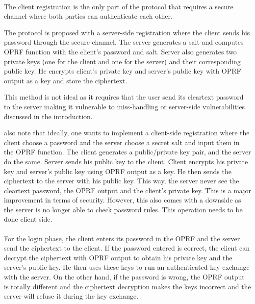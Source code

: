 ﻿\documentclass[../report.tex]{subfiles}
\begin{document}
\paragraph{} \label{sec:opaque_register}
The client registration is the only part of the protocol that requires a secure channel where both parties can authenticate each other.

The protocol is proposed with a server-side registration where the client sends his password through the secure channel. The server generates a salt and computes OPRF function with the client's password and salt. Server also generates two private keys (one for the client and one for the server) and their corresponding public key. He encrypts client's private key and server's public key with OPRF output as a key and store the ciphertext.

This method is not ideal as it requires that the user send its cleartext password to the server making it vulnerable to miss-handling or server-side vulnerabilities discussed in the introduction.

\cite{OPAQUE_Paper} also note that ideally, one wants to implement a client-side registration where the client choose a password and the server choose a secret salt and input them in the OPRF function. The client generates a public/private key pair, and the server do the same. Server sends his public key to the client. Client encrypts his private key and server's public key using OPRF output as a key. He then sends the ciphertext to the server with his public key.
This way, the server never see the cleartext password, the OPRF output and the client's private key. This is a major improvement in terms of security.
However, this also comes with a downside as the server is no longer able to check password rules. This operation needs to be done client side.

\paragraph{}
For the login phase, the client enters its password in the OPRF and the server send the ciphertext to the client.
If the password entered is correct, the client can decrypt the ciphertext with OPRF output to obtain his private key and the server's public key.
He then uses these keys to run an authenticated key exchange with the server.
On the other hand, if the password is wrong, the OPRF output is totally different and the ciphertext decryption makes the keys incorrect and the server will refuse it during the key exchange. %
\end{document}
